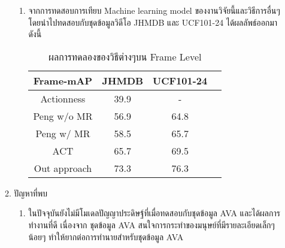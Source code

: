 \begin{enumerate}
\begin{enumerate}
\begin{enumerate}
			\item จากการทดสอบการเทียบ Machine learning model ของงานวิจัยนี้และวิธีการอื่นๆ โดยนำไปทดสอบกับชุดข้อมูลวิดีโอ JHMDB และ UCF101-24 ได้ผลลัพธ์ออกมาดังนี้
	\begin{table}[!ht]
	\centering
	\begin{tabular}{|c|c|c|c|}
			\hline
			{Frame-mAP}&{JHMDB}&{UCF101-24}\\
			\hline
			Actionness 			& 39.9		& 	-						\\
			Peng w/o MR			& 56.9		& 64.8						\\
			Peng w/  MR 			& 58.5		& 65.7						\\
			ACT					& 65.7		& 69.5						\\
			\hline
			Out approach			& 73.3		& 76.3						\\
			\hline
		\end{tabular}
		\caption{ผลการทดลองของวิธีต่างๆบน Frame Level}
		\label{tab: transfer learning}
		\end{table}
	\end{enumerate}
		\item ปัญหาที่พบ
		\begin{enumerate}
			\item ในปัจจุบันยังไม่มีโมเดลปัญญาประดิษฐ์ที่เมื่อทดสอบกับชุดข้อมูล AVA และได้ผลการทำงานที่ดี เนื่องจาก ชุดข้อมูล AVA สนใจการกระทำของมนุษย์ที่มีรายละเอียดเล็กๆน้อยๆ ทำให้ยากต่อการทำนายสำหรับชุดข้อมูล AVA
		\end{enumerate}	
\end{enumerate}
\end{enumerate}
\clearpage
